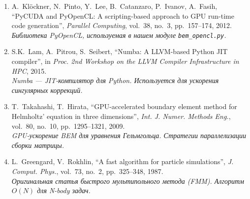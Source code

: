 \documentclass[12pt,a4paper]{article}
\begin{document}
\begin{enumerate}[resume]
  \item A.~Kl{\"o}ckner, N.~Pinto, Y.~Lee, B.~Catanzaro, P.~Ivanov, A.~Fasih, ``PyCUDA and PyOpenCL: A scripting-based approach to GPU run-time code generation'', \textit{Parallel Computing}, vol.~38, no.~3, pp.~157--174, 2012.
  \\ \textit{Библиотека PyOpenCL, используемая в нашем модуле \texttt{bem\_opencl.py}.}

  \item S.K.~Lam, A.~Pitrou, S.~Seibert, ``Numba: A LLVM-based Python JIT compiler'', in \textit{Proc. 2nd Workshop on the LLVM Compiler Infrastructure in HPC}, 2015.
  \\ \textit{Numba --- JIT-компилятор для Python. Используется для ускорения сингулярных коррекций.}

  \item T.~Takahashi, T.~Hirata, ``GPU-accelerated boundary element method for Helmholtz' equation in three dimensions'', \textit{Int. J. Numer. Methods Eng.}, vol.~80, no.~10, pp.~1295--1321, 2009.
  \\ \textit{GPU-ускорение BEM для уравнения Гельмгольца. Стратегии параллелизации сборки матрицы.}

  \item L.~Greengard, V.~Rokhlin, ``A fast algorithm for particle simulations'', \textit{J. Comput. Phys.}, vol.~73, no.~2, pp.~325--348, 1987.
  \\ \textit{Оригинальная статья быстрого мультипольного метода (FMM). Алгоритм $O(N)$ для N-body задач.}
\end{enumerate}
\end{document}

